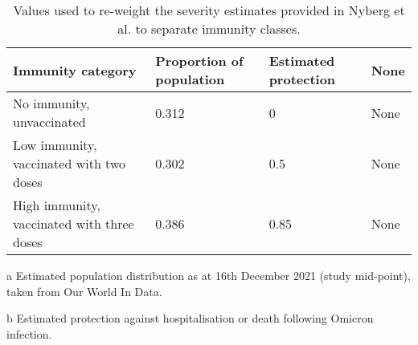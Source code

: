 \begin{table}
    \begin{threeparttable}
    \begin{tabularx}{\textwidth}{| X | X | X | X }
        \hline
        \textbf{Immunity category} & \textbf{Proportion of population} \tnote{a} & \textbf{Estimated protection} \tnote{b} & None\\
        \hline
        No immunity, unvaccinated & 0.312 & 0 & None \\
        \hline
        Low immunity, vaccinated with two doses & 0.302 & 0.5 & None \\
        \hline
        High immunity, vaccinated with three doses & 0.386 & 0.85 & None \\
        \hline
	\end{tabularx}
	\caption{Values used to re-weight the severity estimates provided in Nyberg et al. to separate immunity classes.}
	\label{tab:immunity_weighting}
    \begin{tablenotes}
        \item[a] Estimated population distribution as at 16th December 2021 (study mid-point),
        taken from Our World In Data.
        \item[b] Estimated protection against hospitalisation or death following Omicron infection.
    \end{tablenotes}
    \end{threeparttable}
\end{table}

